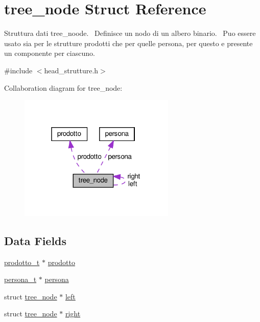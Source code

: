 \hypertarget{structtree__node}{}\section{tree\+\_\+node Struct Reference}
\label{structtree__node}


Struttura dati tree\+\_\+noode.~\newline
Definisce un nodo di un albero binario.~\newline
Puo\textquotesingle{} essere usato sia per le strutture prodotti che per quelle persona, per questo e\textquotesingle{} presente un componente per ciascuno.  




{\ttfamily \#include $<$head\+\_\+strutture.\+h$>$}



Collaboration diagram for tree\+\_\+node\+:
\nopagebreak
\begin{figure}[H]
\begin{center}
\leavevmode
\includegraphics[width=211pt]{structtree__node__coll__graph}
\end{center}
\end{figure}
\subsection*{Data Fields}
\begin{DoxyCompactItemize}
\item 
\hyperlink{head__strutture_8h_afec16ee1fceb6c05f4be3538f36b1997}{prodotto\+\_\+t} $\ast$ \hyperlink{structtree__node_adf54e2cdcc96af8fa0e24eac862bf849}{prodotto}
\item 
\hyperlink{head__strutture_8h_a58439881922e3f6e7ed51e352f2a0c1c}{persona\+\_\+t} $\ast$ \hyperlink{structtree__node_a8aa6034178fc4abc1453c134519d0b92}{persona}
\item 
struct \hyperlink{structtree__node}{tree\+\_\+node} $\ast$ \hyperlink{structtree__node_a3e30a7ba2a4e3286ec7394ba920f2893}{left}
\item 
struct \hyperlink{structtree__node}{tree\+\_\+node} $\ast$ \hyperlink{structtree__node_a6d9a8d8aacc3caada9aed8e308c490a0}{right}
\end{DoxyCompactItemize}


